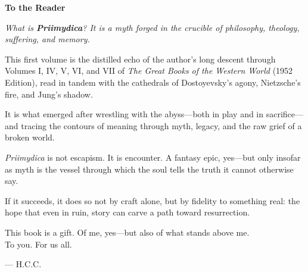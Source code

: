 \documentclass[12pt]{article}
\begin{document}
\begin{titlepage}
\vspace*{\fill}
\begin{center}
\begin{minipage}{0.8\textwidth}
\begin{center}
\textbf{\large To the Reader}
\end{center}
\vspace{1.5em}

\noindent
\textit{What is \textbf{Priimydica}? It is a myth forged in the crucible of philosophy, theology, suffering, and memory.}

\vspace{1em}

\noindent
This first volume is the distilled echo of the author’s long descent through Volumes I, IV, V, VI, and VII of \textit{The Great Books of the Western World} (1952 Edition), read in tandem with the cathedrals of Dostoyevsky’s agony, Nietzsche’s fire, and Jung’s shadow.

\vspace{1em}

It is what emerged after wrestling with the abyss—both in play and in sacrifice—and tracing the contours of meaning through myth, legacy, and the raw grief of a broken world.

\vspace{1em}

\noindent
\textit{Priimydica} is not escapism. It is encounter. A fantasy epic, yes—but only insofar as myth is the vessel through which the soul tells the truth it cannot otherwise say.

\vspace{1em}

\noindent
If it succeeds, it does so not by craft alone, but by fidelity to something real: the hope that even in ruin, story can carve a path toward resurrection.

\vspace{1em}

\noindent
This book is a gift. Of me, yes—but also of what stands above me.\\
To you. For us all.

\vspace{2em}
\begin{flushright}
— H.C.C.
\end{flushright}

\end{minipage}
\end{center}
\vspace*{\fill}
\end{titlepage}
\end{document}
